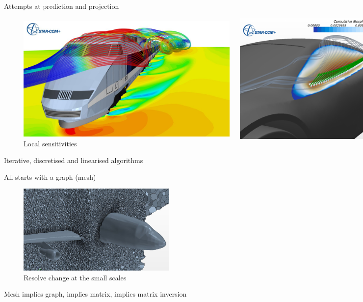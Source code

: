 \documentclass[xcolor=dvipsnames]{beamer}
\begin{document}
\begin{frame}{Attempts at prediction and projection}
\begin{figure}
  \centering
  \begin{columns}
    \centering
    \caption {Numerical approximation}
    \includegraphics[width=0.99\textwidth]{cfd_train}
    \centering
    \caption {Local sensitivities}
    \includegraphics[width=0.99\textwidth]{cfd_car_sensitivity}
  \end{columns}
\end{figure}
Iterative, discretised and linearised algorithms
\end{frame}


\begin{frame}{All starts with a graph (mesh)}
\begin{figure}
  \centering
  \caption {Resolve change at the small scales}
  \includegraphics[width=0.7\textwidth]{cfd_mesh_plane}
\end{figure}
Mesh implies graph, implies matrix, implies matrix inversion
\end{frame}
\end{document}
